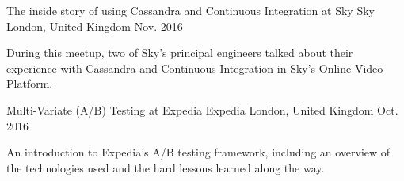 \begin{cventries}
  \cventry
    {The inside story of using Cassandra and Continuous Integration at Sky} %
    {Sky} %
    {London, United Kingdom} %
    {Nov. 2016} %
    {
      \begin{cvitems} %
        \item {During this meetup, two of Sky's principal engineers talked about their experience with Cassandra and Continuous Integration in Sky's Online Video Platform.}
      \end{cvitems}
    }

  \cventry
    {Multi-Variate (A/B) Testing at Expedia} %
    {Expedia} %
    {London, United Kingdom} %
    {Oct. 2016} %
    {
      \begin{cvitems} %
        \item {An introduction to Expedia’s A/B testing framework, including an overview of the technologies used and the hard lessons learned along the way.}
      \end{cvitems}
    }

\end{cventries}